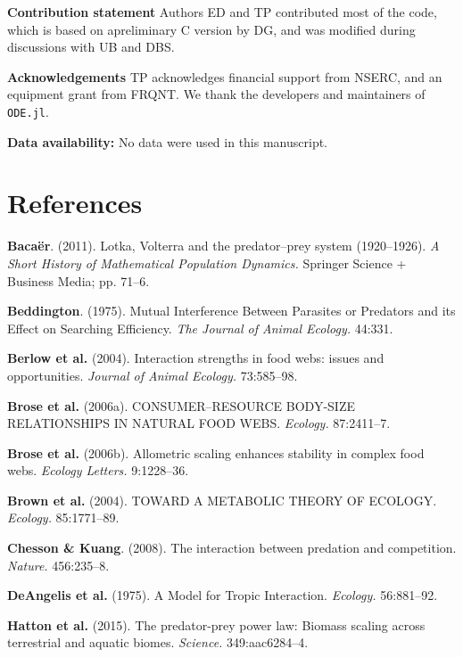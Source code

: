 \documentclass[12pt]{article}
\begin{document}
\textbf{Contribution statement} Authors ED and TP contributed most of
the code, which is based on apreliminary C version by DG, and was
modified during discussions with UB and DBS.

\textbf{Acknowledgements} TP acknowledges financial support from NSERC,
and an equipment grant from FRQNT. We thank the developers and
maintainers of \texttt{ODE.jl}.

\textbf{Data availability:} No data were used in this manuscript.

\section*{References}\label{references}

\hypertarget{refs}{}
\hypertarget{ref-baca11lvp}{}
\textbf{Bacaër}. (2011). Lotka, Volterra and the predator--prey system
(1920--1926). \emph{A Short History of Mathematical Population
Dynamics.} Springer Science + Business Media; pp. 71--6.

\hypertarget{ref-bedd75mip}{}
\textbf{Beddington}. (1975). Mutual Interference Between Parasites or
Predators and its Effect on Searching Efficiency. \emph{The Journal of
Animal Ecology.} 44:331.

\hypertarget{ref-berl04isf}{}
\textbf{Berlow et al.} (2004). Interaction strengths in food webs:
issues and opportunities. \emph{Journal of Animal Ecology.} 73:585--98.

\hypertarget{ref-bros06cbr}{}
\textbf{Brose et al.} (2006a). CONSUMER--RESOURCE BODY-SIZE
RELATIONSHIPS IN NATURAL FOOD WEBS. \emph{Ecology.} 87:2411--7.

\hypertarget{ref-bros06ase}{}
\textbf{Brose et al.} (2006b). Allometric scaling enhances stability in
complex food webs. \emph{Ecology Letters.} 9:1228--36.

\hypertarget{ref-brow04mte}{}
\textbf{Brown et al.} (2004). TOWARD A METABOLIC THEORY OF ECOLOGY.
\emph{Ecology.} 85:1771--89.

\hypertarget{ref-ches08ipc}{}
\textbf{Chesson \& Kuang}. (2008). The interaction between predation and
competition. \emph{Nature.} 456:235--8.

\hypertarget{ref-dean75mti}{}
\textbf{DeAngelis et al.} (1975). A Model for Tropic Interaction.
\emph{Ecology.} 56:881--92.

\hypertarget{ref-hatt15ppl}{}
\textbf{Hatton et al.} (2015). The predator-prey power law: Biomass
scaling across terrestrial and aquatic biomes. \emph{Science.}
349:aac6284--4.
\end{document}

